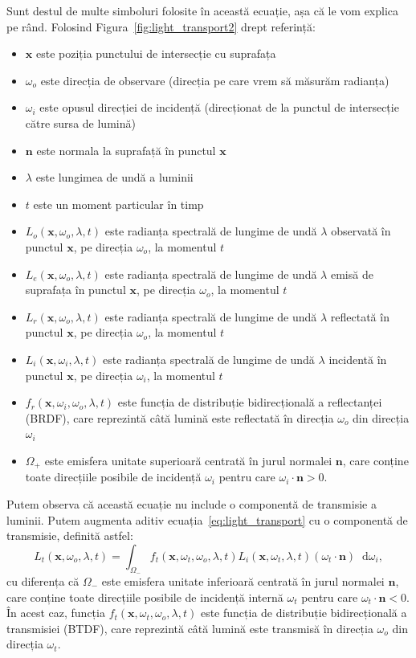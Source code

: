 \documentclass[12pt,a4paper]{report}
\newcommand*\diff{\mathop{}\!\mathrm{d}}
\numberwithin{equation}{section} %
\begin{document}
Sunt destul de multe simboluri folosite în această ecuație, așa că le vom explica
pe rând. Folosind Figura~\ref{fig:light_transport2} drept referință:
\begin{itemize}
	\item $\mathbf{x}$ este poziția punctului de intersecție cu suprafața
	\item $\omega_o$ este direcția de observare (direcția pe care vrem să măsurăm radianța)
	\item $\omega_i$ este opusul direcției de incidență (direcționat de la punctul de intersecție către sursa de lumină)
	\item $\mathbf{n}$ este normala la suprafață în punctul $\mathbf{x}$
	\item $\lambda$ este lungimea de undă a luminii
	\item $t$ este un moment particular în timp
	\item $L_o(\mathbf{x}, \omega_o, \lambda, t)$ este radianța spectrală de lungime de undă $\lambda$ observată în punctul $\mathbf{x}$, pe direcția $\omega_o$, la momentul $t$
	\item $L_e(\mathbf{x}, \omega_o, \lambda, t)$ este radianța spectrală de lungime de undă $\lambda$ emisă de suprafața în punctul $\mathbf{x}$, pe direcția $\omega_o$, la momentul $t$
	\item $L_r(\mathbf{x}, \omega_o, \lambda, t)$ este radianța spectrală de lungime de undă $\lambda$ reflectată în punctul $\mathbf{x}$, pe direcția $\omega_o$, la momentul $t$
	\item $L_i(\mathbf{x}, \omega_i, \lambda, t)$ este radianța spectrală de lungime de undă $\lambda$ incidentă în punctul $\mathbf{x}$, pe direcția $\omega_i$, la momentul $t$
	\item $f_r(\mathbf{x}, \omega_i, \omega_o, \lambda, t)$ este funcția de distribuție bidirecțională a reflectanței (BRDF), care reprezintă câtă lumină este reflectată în direcția $\omega_o$ din direcția $\omega_i$
	\item $\Omega_+$ este emisfera unitate superioară centrată în jurul normalei $\mathbf{n}$, care conține toate direcțiile posibile de incidență $\omega_i$ pentru care $\omega_i \cdot \mathbf{n} > 0$.
\end{itemize}

Putem observa că această ecuație nu include o componentă de transmisie a luminii.
Putem augmenta aditiv ecuația~\ref{eq:light_transport} cu o componentă de transmisie, definită astfel:
\begin{equation}
	L_t(\mathbf{x}, \omega_o, \lambda, t) = \int_{\Omega_-} f_t(\mathbf{x}, \omega_t, \omega_o, \lambda, t) L_i(\mathbf{x}, \omega_t, \lambda, t) (\omega_t \cdot \mathbf{n}) \diff \omega_i,
\end{equation}
cu diferența că $\Omega_-$ este emisfera unitate inferioară centrată în jurul normalei $\mathbf{n}$, care conține toate direcțiile posibile de incidență internă $\omega_t$ pentru care $\omega_t \cdot \mathbf{n} < 0$.
În acest caz, funcția $f_t(\mathbf{x}, \omega_t, \omega_o, \lambda, t)$ este funcția de distribuție bidirecțională a transmisiei (BTDF), care reprezintă câtă lumină este transmisă în direcția $\omega_o$ din direcția $\omega_t$.
\end{document}
